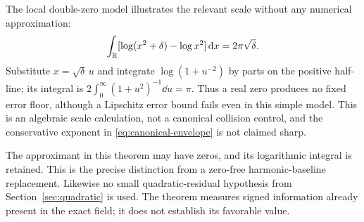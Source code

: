 The local double-zero model illustrates the relevant scale without
any numerical approximation:
\begin{equation}\label{eq:double-log}
 \int_\mathbb R[\log(x^2+\delta)-\log x^2]\,\mathrm d x=2\pi\sqrt\delta.
\end{equation}
Substitute \(x=\sqrt\delta\,u\) and integrate
\(\log(1+u^{-2})\) by parts on the positive half-line; its integral
is \(2\int_0^\infty(1+u^2)^{-1}\dd u=\pi\).
Thus a real zero produces no fixed error floor, although a Lipschitz
error bound fails even in this simple model. This is an algebraic
scale calculation, not a canonical collision control, and the
conservative exponent in \eqref{eq:canonical-envelope} is not
claimed sharp.

The approximant in this theorem may have zeros, and its logarithmic
integral is retained. This is the precise distinction from a
zero-free harmonic-baseline replacement. Likewise no small
quadratic-residual hypothesis from Section~\ref{sec:quadratic}
is used. The theorem measures signed information already present
in the exact field; it does not establish its favorable value.

